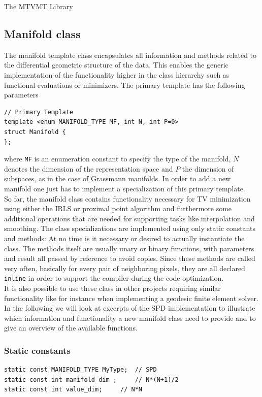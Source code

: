 \begin{chapter}{The MTVMT Library}
\subsection{Manifold class} %
\label{sub:Manifold classes}
The manifold template class encapsulates all information and methods related to the differential geometric structure of the data. 
This enables the generic implementation of the functionality higher in the class hierarchy such as functional evaluations or minimizers.
The primary template has the following parameters
\cppinline
\begin{lstlisting}
// Primary Template
template <enum MANIFOLD_TYPE MF, int N, int P=0>
struct Manifold {
}; 
\end{lstlisting}
where \texttt{MF} is an enumeration constant to specify the type of the manifold, $N$ denotes the dimension of the representation space and $P$ the dimension of subspaces,
as in the case of Grassmann manifolds. In order to add a new manifold one just has to implement a specialization of this primary template.\\

So far, the manifold class contains functionality necessary for TV minimization using either the IRLS or proximal point algorithm and furthermore some additional operations
that are needed for supporting tasks like interpolation and smoothing. The class specializations are implemented using only static constants and methods: At no time is it necessary or 
desired to actually instantiate the class. The methods itself are usually unary or binary functions, with parameters and result all passed by reference to avoid copies.
Since these methods are called very often, basically for every pair of neighboring pixels, they are all declared \texttt{inline} in order to support the compiler during 
the code optimization.\\

It is also possible to use these class in other projects requiring similar functionality like 
for instance when implementing a geodesic finite element solver.\\

In the following we will look at excerpts of the SPD implementation to illustrate which information and functionality a new manifold class need to provide and to give an overview
of the available functions.

\subsubsection{Static constants} %
\label{ssub:Static constants}
\cppinline
\begin{lstlisting}
static const MANIFOLD_TYPE MyType;	// SPD
static const int manifold_dim ;		// N*(N+1)/2
static const int value_dim;		// N*N


\end{lstlisting}
\end{chapter}
